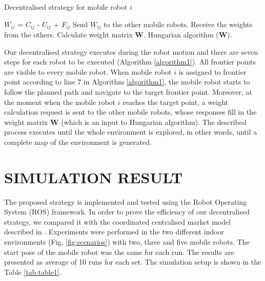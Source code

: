 \documentclass[letterpaper, 10 pt, conference]{ieeeconf}  %
\begin{document}
\begin{algorithm}[H]
\caption{Decentralised strategy for mobile robot $i$}
\label{algorithm1}
\begin{algorithmic}[1]
\State\hspace{\algorithmicindent} $W_{ij}$ = $C_{ij}$ - $U_{ij}$ + $F_{ij}$
\State\hspace{\algorithmicindent} Send $W_{ij}$ to the other mobile robots.
\State \hspace{\algorithmicindent} Receive the weights from the others.
\State \hspace{\algorithmicindent} Calculate weight matrix $\boldsymbol{W}$.
\State \hspace{\algorithmicindent} Hungarian algorithm ($\boldsymbol{W}$).
\EndFor
\end{algorithmic}
\end{algorithm}

Our decentralised strategy executes during the robot motion and there are seven steps for each robot to be executed (Algorithm \ref{algorithm1}).  All frontier points are visible to every mobile robot.
When mobile robot $i$ is assigned to frontier point according to line 7 in Algorithm \ref{algorithm1}, the mobile robot starts to follow the planned path and navigate to the target frontier point. Moreover, at the moment when the mobile robot $i$ reaches the target point, a weight calculation request is sent to the other mobile robots, whose responses fill in the weight matrix $\boldsymbol{W}$ (which is an input to Hungarian algorithm). The described process executes until the whole environment is explored, in other words, until a complete  map of the environment is generated.


\section{SIMULATION RESULT}

The proposed strategy is implemented and tested using the Robot Operating System (ROS) framework. In order to prove the efficiency of our decentralised strategy, we compared it with the coordinated centralised market model described in \cite{burgard}. Experiments were performed in the two different indoor environments (Fig. \ref{fig:scenarios}) with two, three and five mobile robots. The start pose of the mobile robot was the same for each run. The results are presented as average of 10 runs for each set. The simulation setup is shown in the Table \ref{tab:table1}.
\end{document}
